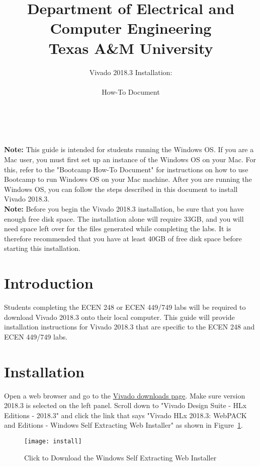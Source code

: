 \documentclass[11pt,twoside,titlepage]{article}
\title{ \huge Department of Electrical and Computer Engineering\\ \huge Texas A\&M University \\}
\author{ \huge Vivado 2018.3 Installation:\\ \\ \huge How-To Document \\ \\ \\ \ta}
\date{}
\begin{document}

\maketitle

\noindent
\textbf{Note:} This guide is intended for students running the Windows OS. If you are a Mac user, you must first set up an instance of the Windows OS on your Mac. For this, refer to the "Bootcamp How-To Document" for instructions on how to use Bootcamp to run Windows OS on your Mac machine. After you are running the Windows OS, you can follow the steps described in this document to install Vivado 2018.3.\\

\noindent
\textbf{Note:} Before you begin the Vivado 2018.3 installation, be sure that you have enough free disk space. The installation alone will require 33GB, and you will need space left over for the files generated while completing the labs. It is therefore recommended that you have at least 40GB of free disk space before starting this installation.\\

\section{Introduction}
Students completing the ECEN 248 or ECEN 449/749 labs will be required to download Vivado 2018.3 onto their local computer. This guide will provide installation instructions for Vivado 2018.3 that are specific to the ECEN 248 and ECEN 449/749 labs.

\section{Installation}

Open a web browser and go to the \href{https://www.xilinx.com/support/download/index.html/content/xilinx/en/downloadNav/vivado-design-tools/2018-3.html}{Vivado downloads page}. Make sure version 2018.3 is selected on the left panel. Scroll down to "Vivado Design Suite -  HLx Editions - 2018.3" and click the link that says "Vivado HLx 2018.3: WebPACK and Editions - Windows Self Extracting Web Installer" as shown in Figure~\ref{install}.\\

\begin{figure}[!h]
	\centering 
	\texttt{[image: install]}
	\caption{Click to Download the Windows Self Extracting Web Installer}
	\label{install}
\end{figure}
\end{document}
